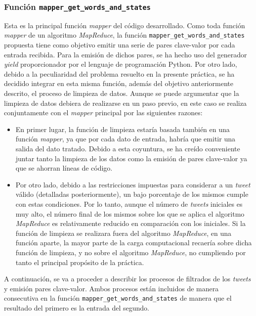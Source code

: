 \documentclass[10pt, spanish]{article}
\begin{document}
\subsubsection{Función \texttt{mapper\_get\_words\_and\_states}}

Esta es la principal función \textit{mapper} del código desarrollado. Como toda función \textit{mapper} de un algoritmo \textit{MapReduce}, la función \texttt{mapper\_get\_words\_and\_states} propuesta tiene como objetivo emitir una serie de pares clave-valor por cada entrada recibida. Para la emisión de dichos pares, se ha hecho uso del generador \textit{yield} proporcionador por el lenguaje de programación Python. Por otro lado, debido a la peculiaridad del problema resuelto en la presente práctica, se ha decidido integrar en esta misma función, además del objetivo anteriormente descrito, el proceso de limpieza de datos. Aunque se puede argumentar que la limpieza de datos debiera de realizarse en un paso previo, en este caso se realiza conjuntamente con el \textit{mapper} principal por las siguientes razones:

\begin{itemize}
\item En primer lugar, la función de limpieza estaría basada también en una función \textit{mapper}, ya que por cada dato de entrada, habría que emitir una salida del dato tratado. Debido a esta coyuntura, se ha creído conveniente juntar tanto la limpieza de los datos como la emisión de pares clave-valor ya que se ahorran líneas de código.
\item Por otro lado, debido a las restricciones impuestas para considerar a un \textit{tweet} válido (detalladas posteriormente), un bajo porcentaje de los mismos cumple con estas condiciones. Por lo tanto, aunque el número de \textit{tweets} iniciales es muy alto, el número final de los mismos sobre los que se aplica el algoritmo \textit{MapReduce} es relativamente reducido en comparación con los iniciales. Si la función de limpieza se realizara fuera del algoritmo \textit{MapReduce}, en una función aparte, la mayor parte de la carga computacional recaería sobre dicha función de limpieza, y no sobre el algoritmo \textit{MapReduce}, no cumpliendo por tanto el principal propósito de la práctica.
\end{itemize} 

A continuación, se va a proceder a describir los procesos de filtrados de los \textit{tweets} y emisión pares clave-valor. Ambos procesos están incluidos de manera consecutiva en la función \texttt{mapper\_get\_words\_and\_states} de manera que el resultado del primero es la entrada del segundo.
\end{document}
